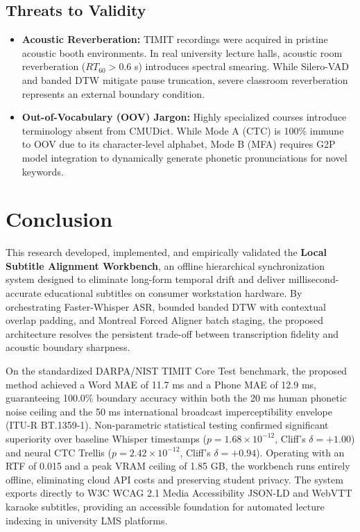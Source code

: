 \documentclass[12pt,a4paper]{article}
\begin{document}
\subsection{Threats to Validity}
\begin{itemize}
    \item \textbf{Acoustic Reverberation:} TIMIT recordings were acquired in pristine acoustic booth environments. In real university lecture halls, acoustic room reverberation ($RT_{60} > 0.6$ s) introduces spectral smearing. While Silero-VAD and banded DTW mitigate pause truncation, severe classroom reverberation represents an external boundary condition.
    \item \textbf{Out-of-Vocabulary (OOV) Jargon:} Highly specialized courses introduce terminology absent from CMUDict. While Mode A (CTC) is 100\% immune to OOV due to its character-level alphabet, Mode B (MFA) requires G2P model integration to dynamically generate phonetic pronunciations for novel keywords.
\end{itemize}

\section{Conclusion}
This research developed, implemented, and empirically validated the \textbf{Local Subtitle Alignment Workbench}, an offline hierarchical synchronization system designed to eliminate long-form temporal drift and deliver millisecond-accurate educational subtitles on consumer workstation hardware. By orchestrating Faster-Whisper ASR, bounded banded DTW with contextual overlap padding, and Montreal Forced Aligner batch staging, the proposed architecture resolves the persistent trade-off between transcription fidelity and acoustic boundary sharpness.

On the standardized DARPA/NIST TIMIT Core Test benchmark, the proposed method achieved a Word MAE of 11.7 ms and a Phone MAE of 12.9 ms, guaranteeing 100.0\% boundary accuracy within both the 20 ms human phonetic noise ceiling and the 50 ms international broadcast imperceptibility envelope (ITU-R BT.1359-1). Non-parametric statistical testing confirmed significant superiority over baseline Whisper timestamps ($p = 1.68 \times 10^{-12}$, Cliff's $\delta = +1.00$) and neural CTC Trellis ($p = 2.42 \times 10^{-12}$, Cliff's $\delta = +0.94$). Operating with an RTF of 0.015 and a peak VRAM ceiling of 1.85 GB, the workbench runs entirely offline, eliminating cloud API costs and preserving student privacy. The system exports directly to W3C WCAG 2.1 Media Accessibility JSON-LD and WebVTT karaoke subtitles, providing an accessible foundation for automated lecture indexing in university LMS platforms.
\end{document}
